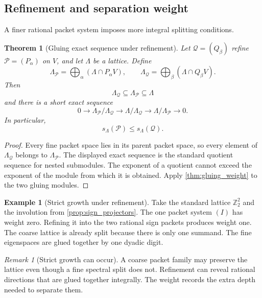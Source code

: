 \documentclass{aomart}
\newtheorem{theorem}{Theorem}[section]
\theoremstyle{definition}
\newtheorem{example}[example]{Example}
\theoremstyle{remark}
\newtheorem{remark}[remark]{Remark}
\newcommand{\Pcal}{\mathcal P}
\newcommand{\Qcal}{\mathcal Q}
\begin{document}
\subsection{Refinement and separation weight}

A finer rational packet system imposes more integral splitting conditions.

\begin{theorem}[Gluing exact sequence under refinement]\label{thm:gluing_refinement}
Let $\Qcal=(Q_\beta)$ refine $\Pcal=(P_\alpha)$ on $V$, and let $\Lambda$ be a lattice.  Define
\[
\Lambda_{\Pcal}
=
\bigoplus_\alpha(\Lambda\cap P_\alpha V),
\qquad
\Lambda_{\Qcal}
=
\bigoplus_\beta(\Lambda\cap Q_\beta V).
\]
Then
\[
\Lambda_{\Qcal}\subseteq\Lambda_{\Pcal}\subseteq\Lambda
\]
and there is a short exact sequence
\[
0
\longrightarrow
\Lambda_{\Pcal}/\Lambda_{\Qcal}
\longrightarrow
\Lambda/\Lambda_{\Qcal}
\longrightarrow
\Lambda/\Lambda_{\Pcal}
\longrightarrow0.
\]
In particular,
\[
\boxed{
s_\Lambda(\Pcal)\leq s_\Lambda(\Qcal).
}
\]
\end{theorem}

\begin{proof}
Every fine packet space lies in its parent packet space, so every element of $\Lambda_{\Qcal}$ belongs to $\Lambda_{\Pcal}$.  The displayed exact sequence is the standard quotient sequence for nested submodules.  The exponent of a quotient cannot exceed the exponent of the module from which it is obtained.  Apply \cref{thm:gluing_weight} to the two gluing modules.
\end{proof}

\begin{example}[Strict growth under refinement]\label{ex:strict_weight_growth}
Take the standard lattice $\mathbb Z_2^2$ and the involution from \cref{prop:sign_projectors}.  The one packet system $(I)$ has weight zero.  Refining it into the two rational sign packets produces weight one.  The coarse lattice is already split because there is only one summand.  The fine eigenspaces are glued together by one dyadic digit.
\end{example}

\begin{remark}[Strict growth can occur]\label{rem:strict_growth}
A coarse packet family may preserve the lattice even though a fine spectral split does not.  Refinement can reveal rational directions that are glued together integrally.  The weight records the extra depth needed to separate them.
\end{remark}
\end{document}

